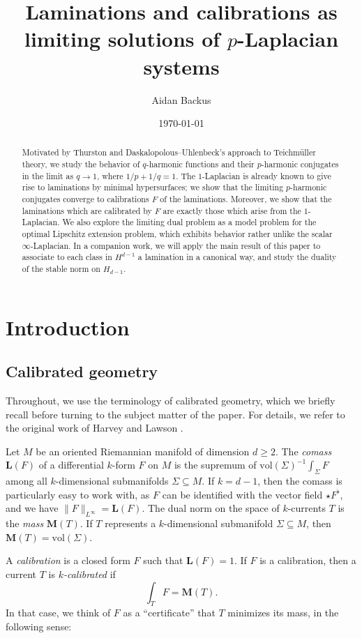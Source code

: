 \documentclass[reqno,11pt]{amsart}
\title{Laminations and calibrations as limiting solutions of $p$-Laplacian systems}
\author{Aidan Backus}
\date{\today}
\newcommand{\vol}{\mathrm{vol}}
\newcommand{\Mass}{\mathbf M}
\newcommand{\Comass}{\mathbf L}
\newcommand{\dfn}[1]{\emph{#1}\index{#1}}
\theoremstyle{definition}
\numberwithin{equation}{section}
\begin{document}
\begin{abstract}
Motivated by Thurston and Daskalopolous--Uhlenbeck's approach to Teichm\"uller theory, we study the behavior of $q$-harmonic functions and their $p$-harmonic conjugates in the limit as $q \to 1$, where $1/p + 1/q = 1$.
The $1$-Laplacian is already known to give rise to laminations by minimal hypersurfaces; we show that the limiting $p$-harmonic conjugates converge to calibrations $F$ of the laminations.
Moreover, we show that the laminations which are calibrated by $F$ are exactly those which arise from the $1$-Laplacian.
We also explore the limiting dual problem as a model problem for the optimal Lipschitz extension problem, which exhibits behavior rather unlike the scalar $\infty$-Laplacian.
In a companion work, we will apply the main result of this paper to associate to each class in $H^{d - 1}$ a lamination in a canonical way, and study the duality of the stable norm on $H_{d - 1}$.
\end{abstract}

\maketitle

\section{Introduction}
\subsection{Calibrated geometry}
Throughout, we use the terminology of calibrated geometry, which we briefly recall before turning to the subject matter of the paper.
For details, we refer to the original work of Harvey and Lawson \cite{Harvey82}.

Let $M$ be an oriented Riemannian manifold of dimension $d \geq 2$.
The \dfn{comass} $\Comass(F)$ of a differential $k$-form $F$ on $M$ is the supremum of $\vol(\Sigma)^{-1} \int_\Sigma F$ among all $k$-dimensional submanifolds $\Sigma \subseteq M$.
If $k = d - 1$, then the comass is particularly easy to work with, as $F$ can be identified with the vector field $\star F^\flat$, and we have $\|F\|_{L^\infty} = \Comass(F)$.
The dual norm on the space of $k$-currents $T$ is the \dfn{mass} $\Mass(T)$.
If $T$ represents a $k$-dimensional submanifold $\Sigma \subseteq M$, then $\Mass(T) = \vol(\Sigma)$.

A \dfn{calibration} is a closed form $F$ such that $\Comass(F) = 1$.
If $F$ is a calibration, then a current $T$ is \dfn{$k$-calibrated} if
$$\int_T F = \Mass(T).$$
In that case, we think of $F$ as a ``certificate'' that $T$ minimizes its mass, in the following sense:
\end{document}
